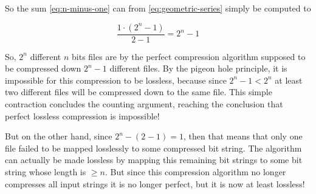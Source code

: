 So the sum \eqref{eq:n-minus-one} can from \eqref{eq:geometric-series}
simply be computed to

\begin{equation*}
  \frac{1 \cdot (2^{n} - 1)}{2 -1} = 2^{n} - 1
\end{equation*}

So, $2^n$ different $n$ bits files are by the perfect compression
algorithm supposed to be compressed down $2^n - 1$ different files. By
the pigeon hole principle, it is impossible for this compression to be
lossless, because since $2^n - 1 < 2^n$ at least two different files
will be compressed down to the same file. This simple contraction
concludes the counting argument, reaching the conclusion that perfect
lossless compression is impossible!

But on the other hand, since $2^n - (2^{} - 1) = 1$, then that means
that only one file failed to be mapped losslessly to some compressed
bit string. The algorithm can actually be made lossless by mapping
this remaining bit strings to some bit string whose length is $\ge
n$. But since this compression algorithm no longer compresses all input strings it
is no longer perfect, but it is now at least lossless!